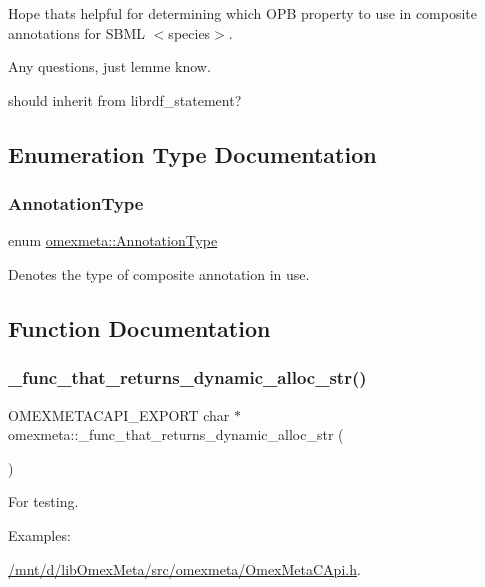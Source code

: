 Hope that\textquotesingle{}s helpful for determining which O\+PB property to use in composite annotations for S\+B\+ML $<$species$>$.

Any questions, just lemme know.

should inherit from librdf\+\_\+statement? 

\subsection{Enumeration Type Documentation}
\mbox{\label{namespaceomexmeta_a1129ebb8a92218ebb27b9c76ac8462f7}} 
\subsubsection{\texorpdfstring{Annotation\+Type}{AnnotationType}}
{\footnotesize\ttfamily enum \hyperlink{namespaceomexmeta_a1129ebb8a92218ebb27b9c76ac8462f7}{omexmeta\+::\+Annotation\+Type}}

Denotes the type of composite annotation in use. 

\subsection{Function Documentation}
\mbox{\label{namespaceomexmeta_a1d7bca5e4a24d7482048bd28d901e502}} 
\subsubsection{\texorpdfstring{\+\_\+func\+\_\+that\+\_\+returns\+\_\+dynamic\+\_\+alloc\+\_\+str()}{\_func\_that\_returns\_dynamic\_alloc\_str()}}
{\footnotesize\ttfamily O\+M\+E\+X\+M\+E\+T\+A\+C\+A\+P\+I\+\_\+\+E\+X\+P\+O\+RT char $\ast$ omexmeta\+::\+\_\+func\+\_\+that\+\_\+returns\+\_\+dynamic\+\_\+alloc\+\_\+str (\begin{DoxyParamCaption}{ }\end{DoxyParamCaption})}

For testing. \begin{Desc}
\item[Examples\+: ]\par
\hyperlink{_2mnt_2d_2libOmexMeta_2src_2omexmeta_2OmexMetaCApi_8h-example}{/mnt/d/lib\+Omex\+Meta/src/omexmeta/\+Omex\+Meta\+C\+Api.\+h}.\end{Desc}
\mbox{\label{namespaceomexmeta_a96e4c18dc172184811a0bd6468d00b35}} 
